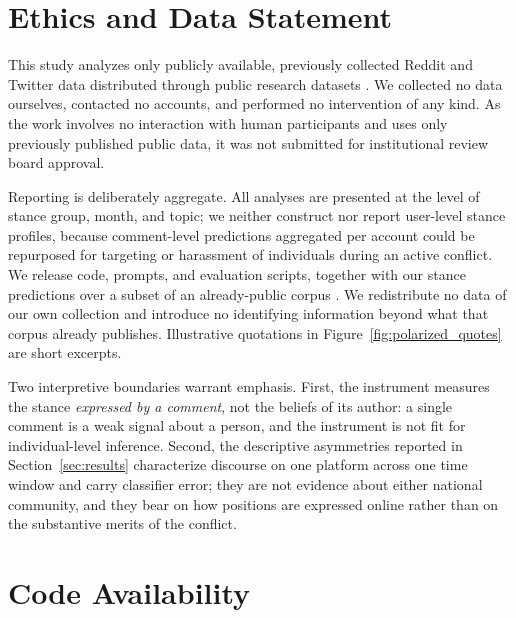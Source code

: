 \documentclass[letterpaper]{article} %
\begin{document}

\section*{Ethics and Data Statement}\label{sec:ethics}

This study analyzes only publicly available, previously collected Reddit and Twitter data distributed through public research datasets \cite{asaniczka_2024,ukraine_russia_reddit_data,p_stance_data}. We collected no data ourselves, contacted no accounts, and performed no intervention of any kind. As the work involves no interaction with human participants and uses only previously published public data, it was not submitted for institutional review board approval.

Reporting is deliberately aggregate. All analyses are presented at the level of stance group, month, and topic; we neither construct nor report user-level stance profiles, because comment-level predictions aggregated per account could be repurposed for targeting or harassment of individuals during an active conflict. We release code, prompts, and evaluation scripts, together with our stance predictions over a subset of an already-public corpus \cite{asaniczka_2024}. We redistribute no data of our own collection and introduce no identifying information beyond what that corpus already publishes. Illustrative quotations in Figure~\ref{fig:polarized_quotes} are short excerpts.

Two interpretive boundaries warrant emphasis. First, the instrument measures the stance \emph{expressed by a comment}, not the beliefs of its author: a single comment is a weak signal about a person, and the instrument is not fit for individual-level inference. Second, the descriptive asymmetries reported in Section~\ref{sec:results} characterize discourse on one platform across one time window and carry classifier error; they are not evidence about either national community, and they bear on how positions are expressed online rather than on the substantive merits of the conflict.


\section*{Code Availability}\label{sec:code-availability}
\end{document}
